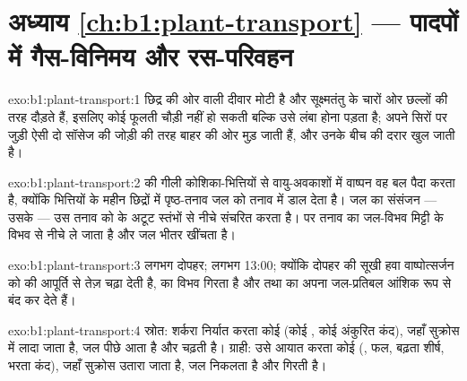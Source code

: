 \section*{अध्याय \ref{ch:b1:plant-transport} --- पादपों में गैस-विनिमय और रस-परिवहन}

\begin{solution}{exo:b1:plant-transport:1}
छिद्र की ओर वाली दीवार मोटी है और सूक्ष्मतंतु  के चारों ओर
छल्लों की तरह दौड़ते हैं, इसलिए कोई फूलती  चौड़ी नहीं हो सकती बल्कि
उसे लंबा होना पड़ता है; अपने सिरों पर जुड़ी ऐसी दो  सॉसेज की
जोड़ी की तरह बाहर की ओर मुड़ जाती हैं, और उनके बीच की दरार खुल जाती है।
\end{solution}

\begin{solution}{exo:b1:plant-transport:2}
 की गीली कोशिका-भित्तियों से वायु-अवकाशों में वाष्पन
वह बल पैदा करता है, क्योंकि भित्तियों के महीन छिद्रों में पृष्ठ-तनाव
जल को तनाव में डाल देता है। जल का संसंजन --- उसके 
--- उस तनाव को  के अटूट स्तंभों से नीचे संचरित करता है।
 पर तनाव  का जल-विभव मिट्टी के विभव से नीचे ले जाता है और
जल भीतर खींचता है।
\end{solution}

\begin{solution}{exo:b1:plant-transport:3}
लगभग दोपहर; लगभग 13:00; क्योंकि दोपहर की सूखी हवा
वाष्पोत्सर्जन को  की आपूर्ति से तेज़ चढ़ा देती है,  का
विभव गिरता है और  तथा  का अपना जल-प्रतिबल
 आंशिक रूप से बंद कर देते हैं।
\end{solution}

\begin{solution}{exo:b1:plant-transport:4}
स्रोत: शर्करा निर्यात करता कोई  (कोई , कोई अंकुरित कंद), जहाँ
सुक्रोस  में लादा जाता है, जल पीछे आता है और 
चढ़ती है। ग्राही: उसे आयात करता कोई  (, फल, बढ़ता शीर्ष, भरता
कंद), जहाँ सुक्रोस उतारा जाता है, जल निकलता है और  गिरती है।
\end{solution}

